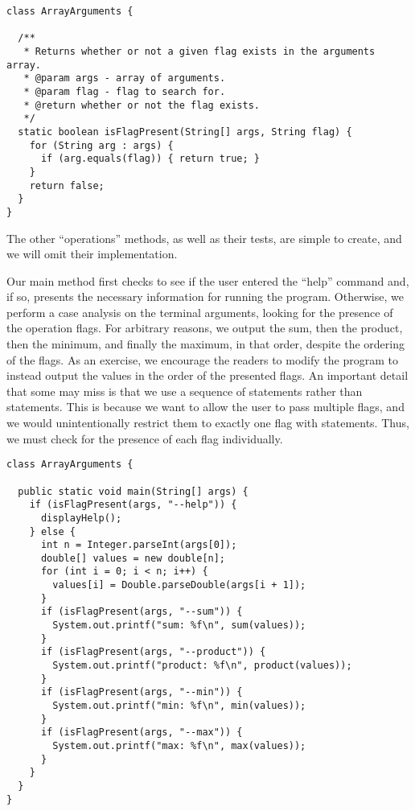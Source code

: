 \begin{lstlisting}[language=MyJava]
class ArrayArguments {

  /**
   * Returns whether or not a given flag exists in the arguments array.
   * @param args - array of arguments.
   * @param flag - flag to search for.
   * @return whether or not the flag exists.
   */
  static boolean isFlagPresent(String[] args, String flag) {
    for (String arg : args) {
      if (arg.equals(flag)) { return true; }
    }
    return false;
  }
}
\end{lstlisting}

The other ``operations'' methods, as well as their tests, are simple to create, and we will omit their implementation. 

Our main method first checks to see if the user entered the ``help'' command and, if so, presents the necessary information for running the program. 
Otherwise, we perform a case analysis on the terminal arguments, looking for the presence of the operation flags. 
For arbitrary reasons, we output the sum, then the product, then the minimum, and finally the maximum, in that order, despite the ordering of the flags. 
As an exercise, we encourage the readers to modify the program to instead output the values in the order of the presented flags. 
An important detail that some may miss is that we use a sequence of  statements rather than  statements. 
This is because we want to allow the user to pass multiple flags, and we would unintentionally restrict them to exactly one flag with  statements. 
Thus, we must check for the presence of each flag individually.

\begin{lstlisting}[language=MyJava]
class ArrayArguments {

  public static void main(String[] args) {
    if (isFlagPresent(args, "--help")) {
      displayHelp();
    } else {
      int n = Integer.parseInt(args[0]);
      double[] values = new double[n];
      for (int i = 0; i < n; i++) { 
        values[i] = Double.parseDouble(args[i + 1]); 
      }
      if (isFlagPresent(args, "--sum")) { 
        System.out.printf("sum: %f\n", sum(values)); 
      }
      if (isFlagPresent(args, "--product")) { 
        System.out.printf("product: %f\n", product(values)); 
      }
      if (isFlagPresent(args, "--min")) { 
        System.out.printf("min: %f\n", min(values)); 
      }
      if (isFlagPresent(args, "--max")) { 
        System.out.printf("max: %f\n", max(values)); 
      }
    }
  }
}
\end{lstlisting}

